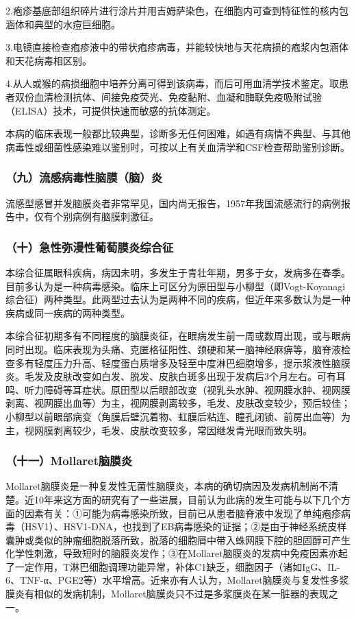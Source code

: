 2.疱疹基底部组织碎片进行涂片并用吉姆萨染色，在细胞内可查到特征性的核内包涵体和典型的水痘巨细胞。

3.电镜直接检查疱疹液中的带状疱疹病毒，并能较快地与天花病损的疱浆内包涵体和天花病毒相区别。

4.从人或猴的病损细胞中培养分离可得到该病毒，而后可用血清学技术鉴定。取患者双份血清检测抗体、间接免疫荧光、免疫黏附、血凝和酶联免疫吸附试验（ELISA）技术，可提供快速而敏感的抗体测定。

本病的临床表现一般都比较典型，诊断多无任何困难，如遇有病情不典型、与其他病毒性或细菌性感染难以鉴别时，可按以上有关血清学和CSF检查帮助鉴别诊断。

\subsubsection{（九）流感病毒性脑膜（脑）炎}

流感型感冒并发脑膜炎者非常罕见，国内尚无报告，1957年我国流感流行的病例报告中，仅有个别病例有脑膜刺激征。

\subsubsection{（十）急性弥漫性葡萄膜炎综合征}

本综合征属眼科疾病，病因未明，多发生于青壮年期，男多于女，发病多在春季。目前多认为是一种病毒感染。临床上可区分为原田型与小柳型（即Vogt-Koyanagi综合征）两种类型。此两型过去认为是两种不同的疾病，但近年来多数认为是一种疾病或同一疾病的两种类型。

本综合征初期多有不同程度的脑膜炎征，在眼病发生前一周或数周出现，或与眼病同时出现。临床表现为头痛、克匿格征阳性、颈硬和某一脑神经麻痹等，脑脊液检查多有轻度压力升高、轻度蛋白质增多及轻至中度淋巴细胞增多，提示浆液性脑膜炎。毛发及皮肤改变如白发、脱发、皮肤白斑多出现于发病后3个月左右。可有耳鸣、听力障碍等耳症状。原田型以后眼部改变（视乳头水肿、视网膜水肿、视网膜剥离、视网膜出血等）为主，视网膜剥离较多，毛发、皮肤改变较少，预后较佳；小柳型以前眼部病变（角膜后壁沉着物、虹膜后粘连、瞳孔闭锁、前房出血等）为主，视网膜剥离较少，毛发、皮肤改变较多，常因继发青光眼而致失明。

\subsubsection{（十一）Mollaret脑膜炎}

Mollaret脑膜炎是一种复发性无菌性脑膜炎，本病的确切病因及发病机制尚不清楚。近10年来这方面的研究有了一些进展，目前认为此病的发生可能与以下几个方面的因素有关：①可能为病毒感染所致，目前已从患者脑脊液中发现了单纯疱疹病毒（HSV1）、HSV1-DNA，也找到了EB病毒感染的证据；②是由于神经系统皮样囊肿或类似的肿瘤细胞脱落所致，脱落的细胞屑中带入蛛网膜下腔的胆固醇可产生化学性刺激，导致短时的脑膜炎发作；③在Mollaret脑膜炎的发病中免疫因素亦起了一定作用，T淋巴细胞调理功能异常，补体C1缺乏，细胞因子（诸如IgG、IL-6、TNF-α、PGE2等）水平增高。近来亦有人认为，Mollaret脑膜炎与复发性多浆膜炎有相似的发病机制，Mollaret脑膜炎只不过是多浆膜炎在某一脏器的表现之一。

